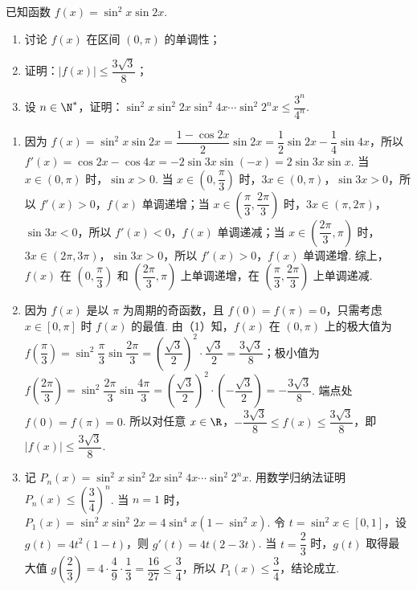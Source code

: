 \begin{problem}
已知函数 \(f(x)=\sin^2 x\sin 2x\).

\begin{enumerate}
\item 讨论 \(f(x)\) 在区间 \((0,\pi)\) 的单调性；
\item 证明：\(|f(x)|\leq \dfrac{3\sqrt3}{8}\)；
\item 设 \(n\in\N^*\)，证明：\(\sin^2 x\sin^2 2x\sin^2 4x\cdots \sin^2 2^n x\leq \dfrac{3^n}{4^n}\).
\end{enumerate}
\end{problem}

\begin{solution}
\begin{enumerate}
\item 因为 \(f(x)=\sin^2 x\sin 2x=\dfrac{1-\cos 2x}{2}\sin 2x=\dfrac12\sin 2x-\dfrac14\sin 4x\)，所以 \(f'(x)=\cos 2x-\cos 4x=-2\sin 3x\sin(-x)=2\sin 3x\sin x\). 当 \(x\in(0,\pi)\) 时，\(\sin x>0\). 当 \(x\in\left(0,\dfrac{\pi}{3}\right)\) 时，\(3x\in(0,\pi)\)，\(\sin 3x>0\)，所以 \(f'(x)>0\)，\(f(x)\) 单调递增；当 \(x\in\left(\dfrac{\pi}{3},\dfrac{2\pi}{3}\right)\) 时，\(3x\in(\pi,2\pi)\)，\(\sin 3x<0\)，所以 \(f'(x)<0\)，\(f(x)\) 单调递减；当 \(x\in\left(\dfrac{2\pi}{3},\pi\right)\) 时，\(3x\in(2\pi,3\pi)\)，\(\sin 3x>0\)，所以 \(f'(x)>0\)，\(f(x)\) 单调递增. 综上，\(f(x)\) 在 \(\left(0,\dfrac{\pi}{3}\right)\) 和 \(\left(\dfrac{2\pi}{3},\pi\right)\) 上单调递增，在 \(\left(\dfrac{\pi}{3},\dfrac{2\pi}{3}\right)\) 上单调递减.
\item 因为 \(f(x)\) 是以 \(\pi\) 为周期的奇函数，且 \(f(0)=f(\pi)=0\)，只需考虑 \(x\in[0,\pi]\) 时 \(f(x)\) 的最值. 由（1）知，\(f(x)\) 在 \((0,\pi)\) 上的极大值为 \(f\left(\dfrac{\pi}{3}\right)=\sin^2\dfrac{\pi}{3}\sin\dfrac{2\pi}{3}=\left(\dfrac{\sqrt3}{2}\right)^2\cdot\dfrac{\sqrt3}{2}=\dfrac{3\sqrt3}{8}\)；极小值为 \(f\left(\dfrac{2\pi}{3}\right)=\sin^2\dfrac{2\pi}{3}\sin\dfrac{4\pi}{3}=\left(\dfrac{\sqrt3}{2}\right)^2\cdot\left(-\dfrac{\sqrt3}{2}\right)=-\dfrac{3\sqrt3}{8}\). 端点处 \(f(0)=f(\pi)=0\). 所以对任意 \(x\in\R\)，\(-\dfrac{3\sqrt3}{8}\le f(x)\le\dfrac{3\sqrt3}{8}\)，即 \(|f(x)|\le\dfrac{3\sqrt3}{8}\).
\item 记 \(P_n(x)=\sin^2 x\sin^2 2x\sin^2 4x\cdots\sin^2 2^n x\). 用数学归纳法证明 \(P_n(x)\le\left(\dfrac34\right)^n\).
当 \(n=1\) 时，\(P_1(x)=\sin^2 x\sin^2 2x=4\sin^4 x(1-\sin^2 x)\). 令 \(t=\sin^2 x\in[0,1]\)，设 \(g(t)=4t^2(1-t)\)，则 \(g'(t)=4t(2-3t)\). 当 \(t=\dfrac23\) 时，\(g(t)\) 取得最大值 \(g\left(\dfrac23\right)=4\cdot\dfrac49\cdot\dfrac13=\dfrac{16}{27}\le\dfrac34\)，所以 \(P_1(x)\le\dfrac34\)，结论成立.

\end{enumerate}
\end{solution}
